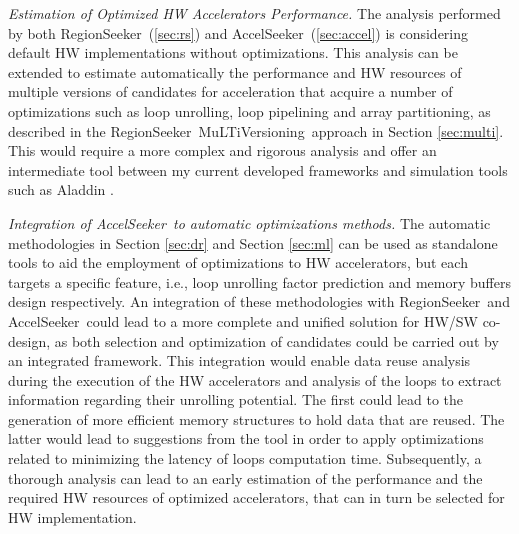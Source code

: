 \documentclass[]{usiinfthesis}
\newcommand{\aseeker}{{AccelSeeker}}
\newcommand{\rseeker}{{RegionSeeker}}
\newcommand{\multi}{MuLTiVersioning}
\begin{document}
\emph{Estimation of Optimized HW Accelerators Performance.} 
 The analysis performed by both \rseeker\ (\ref{sec:rs}) and \aseeker\ (\ref{sec:accel}) is 
considering default HW implementations without optimizations. This analysis can be 
extended to estimate automatically the performance and HW resources of multiple versions of candidates for acceleration that acquire a number of optimizations such as loop unrolling, loop pipelining and
array partitioning, as described in the \rseeker\ \multi\ approach in Section \ref{sec:multi}. This 
would require a more complex and rigorous analysis and offer an intermediate tool between my current 
developed frameworks and simulation tools such as Aladdin \cite{ShaoJul14}.

\emph{Integration of \aseeker\ to automatic optimizations methods.}
The automatic methodologies in Section \ref{sec:dr} and Section \ref{sec:ml} can be used
as standalone tools to aid the employment of optimizations to HW accelerators, but each targets a specific 
feature, i.e., loop unrolling factor prediction and memory buffers design respectively. An 
integration of these methodologies with \rseeker\ and \aseeker\ could lead to a more complete and unified 
solution for HW/SW co-design, as both selection and optimization of candidates could be carried out 
by an integrated framework. This integration would enable
data reuse analysis during the execution of the HW accelerators and analysis of the loops 
to extract information regarding their unrolling potential. The first could lead to 
the generation of more efficient memory structures to hold data that are reused. The latter would lead to 
suggestions from the tool in order to apply optimizations related to minimizing the latency of loops 
computation time. Subsequently, a thorough analysis can lead to an early estimation of the performance and the 
required HW resources of optimized accelerators, that can in turn be selected for HW implementation.\par
\end{document}
